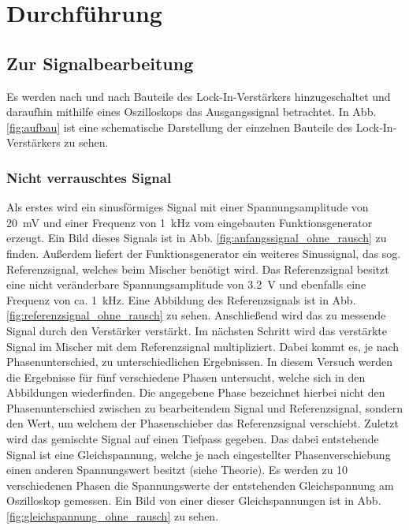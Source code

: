 
\section{Durchführung}

\subsection{Zur Signalbearbeitung}

Es werden nach und nach Bauteile des Lock-In-Verstärkers hinzugeschaltet
und daraufhin mithilfe eines Oszilloskops das Ausgangssignal
betrachtet. In Abb. \ref{fig:aufbau} ist eine schematische Darstellung
der einzelnen Bauteile des Lock-In-Verstärkers zu sehen.

\subsubsection{Nicht verrauschtes Signal}

Als erstes wird ein sinusförmiges Signal mit einer Spannungsamplitude
von \SI{20}{\milli\volt} und einer Frequenz von \SI{1}{\kilo\hertz} vom
eingebauten Funktionsgenerator erzeugt. Ein Bild dieses Signals ist in
Abb. \ref{fig:anfangssignal_ohne_rausch} zu finden. Außerdem liefert der
Funktionsgenerator ein weiteres Sinussignal, das sog. Referenzsignal,
welches beim Mischer benötigt wird. Das Referenzsignal besitzt eine
nicht veränderbare Spannungsamplitude von \SI{3.2}{\volt} und ebenfalls
eine Frequenz von ca. \SI{1}{\kilo\hertz}. Eine Abbildung des
Referenzsignals ist in Abb. \ref{fig:referenzsignal_ohne_rausch} zu
sehen.  Anschließend wird das zu messende Signal durch den Verstärker
verstärkt.  Im nächsten Schritt wird das verstärkte Signal im Mischer
mit dem Referenzsignal multipliziert. Dabei kommt es, je nach
Phasenunterschied, zu unterschiedlichen Ergebnissen. In diesem Versuch
werden die Ergebnisse für fünf verschiedene Phasen untersucht, welche
sich in den Abbildungen
wiederfinden. Die angegebene Phase bezeichnet hierbei nicht den
Phasenunterschied zwischen zu bearbeitendem Signal und Referenzsignal,
sondern den Wert, um welchem der Phasenschieber das Referenzsignal
verschiebt.  Zuletzt wird das gemischte Signal auf einen Tiefpass
gegeben. Das dabei entstehende Signal ist eine Gleichspannung, welche je
nach eingestellter Phasenverschiebung einen anderen Spannungswert
besitzt (siehe Theorie). Es werden zu 10 verschiedenen Phasen die
Spannungswerte der entstehenden Gleichspannung am Oszilloskop
gemessen. Ein Bild von einer dieser Gleichspannungen ist in
Abb. \ref{fig:gleichspannung_ohne_rausch} zu sehen.

